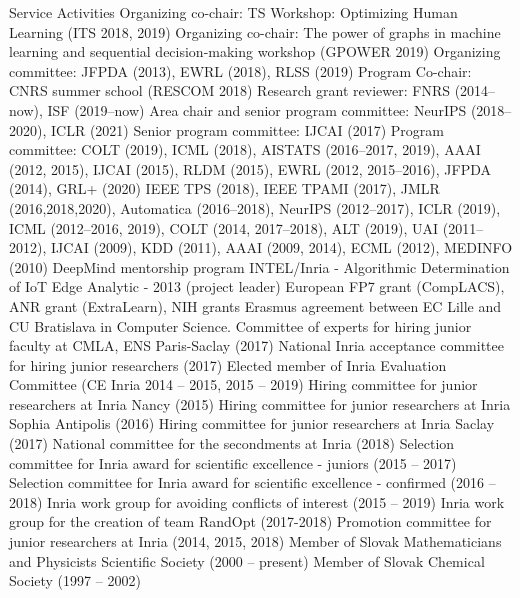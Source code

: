 \documentclass{resume}
\begin{document}

\begin{category}{Service Activities}
\citembullet Organizing co-chair: TS Workshop: Optimizing Human Learning (ITS 2018, 2019)
\citembullet Organizing co-chair: The power of graphs in machine learning and sequential decision-making workshop (GPOWER 2019)
\citembullet Organizing committee: JFPDA (2013), EWRL (2018), RLSS (2019)
\citembullet Program Co-chair: CNRS summer school (RESCOM 2018)
\citembullet Research grant reviewer: FNRS (2014--now), ISF (2019--now)
\citembullet Area chair and senior program committee:  NeurIPS (2018--2020), ICLR  (2021)
\citembullet Senior program committee:  IJCAI (2017)
\citembullet Program committee: COLT (2019), ICML (2018), AISTATS (2016--2017, 2019), AAAI (2012, 2015), IJCAI (2015), RLDM (2015), EWRL 
(2012, 2015--2016), JFPDA (2014), GRL+ (2020)
\citembullet  IEEE TPS (2018), IEEE TPAMI (2017), JMLR (2016,2018,2020), Automatica (2016--2018), NeurIPS (2012--2017), ICLR (2019), ICML (2012--2016, 2019), COLT
(2014, 2017--2018), ALT (2019), UAI (2011--2012), IJCAI (2009), KDD (2011), AAAI (2009, 2014), ECML
(2012), MEDINFO (2010)
\citembullet DeepMind mentorship program
\citembullet INTEL/Inria - Algorithmic Determination of IoT Edge Analytic -
2013 (project leader)
\citembullet  European FP7 grant (CompLACS), ANR grant (ExtraLearn), NIH grants
\citembullet Erasmus agreement between EC Lille and CU Bratislava in Computer
Science.
\citembullet Committee of experts for hiring junior faculty at CMLA, ENS Paris-Saclay  (2017)
\citembullet National Inria acceptance committee for hiring junior researchers (2017)
\citembullet Elected member of Inria Evaluation Committee (CE Inria 2014 -- 2015, 2015 -- 2019)
\citembullet Hiring committee for junior researchers at Inria Nancy (2015)
\citembullet Hiring committee for junior researchers at Inria Sophia Antipolis (2016)
\citembullet Hiring committee for junior researchers at Inria Saclay (2017)
\citembullet National committee for the secondments at Inria (2018)
\citembullet Selection committee for Inria award for scientific excellence - juniors (2015 -- 2017)
\citembullet Selection committee for Inria award for scientific excellence - confirmed (2016 -- 2018)
\citembullet Inria work group for avoiding conflicts of interest (2015 -- 2019)
\citembullet Inria work group for the creation of team RandOpt (2017-2018)
\citembullet Promotion committee for junior researchers at Inria (2014, 2015, 2018)
\citembullet Member of Slovak Mathematicians and Physicists Scientific Society 
(2000 -- present)
\citembullet Member of Slovak Chemical Society (1997 -- 2002)
\end{category}
\end{document}
